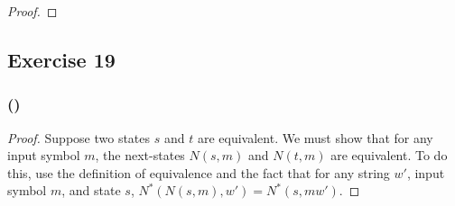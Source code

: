 \documentclass[14pt]{extarticle}
\begin{document}
\begin{proof}

\end{proof}

\subsection{Exercise 19}

\subsubsection{()}

\begin{proof}
Suppose two states \(s\) and \(t\) are equivalent. We must show that for any input symbol \(m\), the next-states 
\(N(s, m)\) and \(N(t, m)\) are equivalent. To do this, use the definition of equivalence and the fact that for any string 
\(w'\), input symbol \(m\), and state \(s\), \(N^*(N(s, m), w') = N^*(s, mw')\).
\end{proof}
\end{document}
